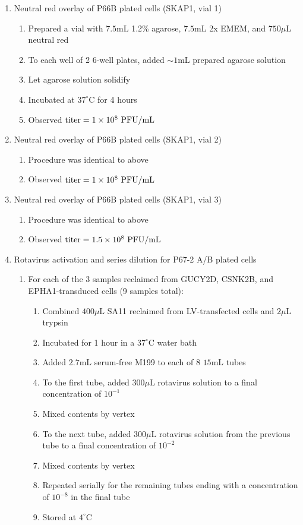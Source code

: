 \begin{enumerate}
	\item Neutral red overlay of P66B plated cells (SKAP1, vial 1)
		\begin{enumerate}
			\item Prepared a vial with $7.5$mL 1.2\% agarose, $7.5$mL 2x EMEM, and $750\mu$L neutral red
			\item To each well of 2 6-well plates, added $\sim 1$mL prepared agarose solution
			\item Let agarose solution solidify
			\item Incubated at $37^{\circ}$C for 4 hours
			\item Observed $\text{titer}=1\times 10^{8}\text{ PFU/mL}$
		\end{enumerate}
	\item Neutral red overlay of P66B plated cells (SKAP1, vial 2)
		\begin{enumerate}
			\item Procedure was identical to above
			\item Observed $\text{titer}=1\times 10^{8}\text{ PFU/mL}$
		\end{enumerate}
	\item Neutral red overlay of P66B plated cells (SKAP1, vial 3)
		\begin{enumerate}
			\item Procedure was identical to above
			\item Observed $\text{titer}=1.5\times 10^{8}\text{ PFU/mL}$
		\end{enumerate}
	\item Rotavirus activation and series dilution for P67-2 A/B plated cells
		\begin{enumerate}
			\item For each of the 3 samples reclaimed from GUCY2D, CSNK2B, and EPHA1-transduced cells (9 samples total):
				\begin{enumerate}
					\item Combined $400\mu$L SA11 reclaimed from LV-transfected cells and $2\mu$L trypsin
					\item Incubated for 1 hour in a $37^{\circ}$C water bath
					\item Added $2.7$mL serum-free M199 to each of 8 $15$mL tubes
					\item To the first tube, added $300\mu$L rotavirus solution to a final concentration of $10^{-1}$
					\item Mixed contents by vertex
					\item To the next tube, added $300\mu$L rotavirus solution from the previous tube to a final concentration of $10^{-2}$
					\item Mixed contents by vertex
					\item Repeated serially for the remaining tubes ending with a concentration of $10^{-8}$ in the final tube
					\item Stored at $4^{\circ}$C
				\end{enumerate}
		\end{enumerate}
\end{enumerate}

